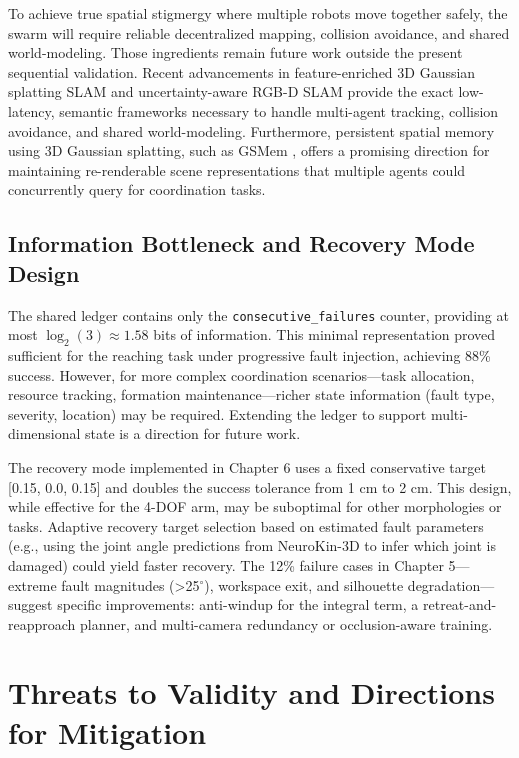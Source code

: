 \documentclass[12pt,a4paper,oneside]{report}
\begin{document}
To achieve true spatial stigmergy where multiple robots move together safely, the swarm will require reliable decentralized mapping, collision avoidance, and shared world-modeling. Those ingredients remain future work outside the present sequential validation. Recent advancements in feature-enriched 3D Gaussian splatting SLAM \cite{thirgood2025featureslam} and uncertainty-aware RGB-D SLAM \cite{tran2025varsplat} provide the exact low-latency, semantic frameworks necessary to handle multi-agent tracking, collision avoidance, and shared world-modeling. Furthermore, persistent spatial memory using 3D Gaussian splatting, such as GSMem \cite{lu2025gsmem}, offers a promising direction for maintaining re-renderable scene representations that multiple agents could concurrently query for coordination tasks.

\subsection{Information Bottleneck and Recovery Mode Design}

The shared ledger contains only the \texttt{consecutive\_failures} counter, providing at most $\log_2(3) \approx 1.58$ bits of information. This minimal representation proved sufficient for the reaching task under progressive fault injection, achieving 88\% success. However, for more complex coordination scenarios---task allocation, resource tracking, formation maintenance---richer state information (fault type, severity, location) may be required. Extending the ledger to support multi-dimensional state is a direction for future work.

The recovery mode implemented in Chapter 6 uses a fixed conservative target [0.15, 0.0, 0.15] and doubles the success tolerance from 1 cm to 2 cm. This design, while effective for the 4-DOF arm, may be suboptimal for other morphologies or tasks. Adaptive recovery target selection based on estimated fault parameters (e.g., using the joint angle predictions from NeuroKin-3D to infer which joint is damaged) could yield faster recovery. The 12\% failure cases in Chapter 5---extreme fault magnitudes (>25$^\circ$), workspace exit, and silhouette degradation---suggest specific improvements: anti-windup for the integral term, a retreat-and-reapproach planner, and multi-camera redundancy or occlusion-aware training.

\section{Threats to Validity and Directions for Mitigation}
\end{document}
